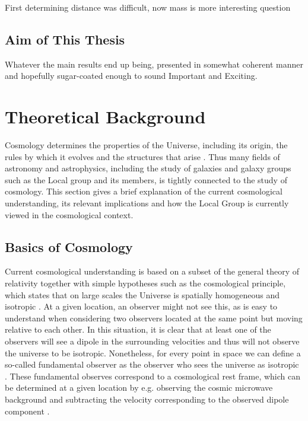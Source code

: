 \documentclass[english, oneside]{HYgradu}
\begin{document}
First determining distance was difficult, now mass is more interesting question

\section{Aim of This Thesis}
Whatever the main results end up being, presented in somewhat coherent manner and hopefully sugar-coated enough to sound Important and Exciting.


\chapter{Theoretical Background}

Cosmology determines the properties of the Universe, including its origin, the rules by which it evolves and the structures that arise \citep{mo2010galaxy}. Thus many fields of astronomy and astrophysics, including the study of galaxies and galaxy groups such as the Local group and its members, is tightly connected to the study of cosmology. This section gives a brief explanation of the current cosmological understanding, its relevant implications and how the Local Group is currently viewed in the cosmological context.

\section{Basics of Cosmology}
Current cosmological understanding is based on a subset of the general theory of relativity together with simple hypotheses such as the cosmological principle, which states that on large scales the Universe is spatially homogeneous and isotropic \citep{mo2010galaxy}. At a given location, an observer might not see this, as is easy to understand when considering two observers located at the same point but moving relative to each other. In this situation, it is  clear that at least one of the observers will see a dipole in the surrounding velocities and thus will not observe the universe to be isotropic. Nonetheless, for every point in space we can define a so-called fundamental observer as the observer who sees the universe as isotropic \citep{mo2010galaxy}. These fundamental observes correspond to a cosmological rest frame, which can be determined at a given location by e.g. observing the cosmic microwave background and subtracting the velocity corresponding to the observed dipole component \citep{mo2010galaxy}.
\end{document}

